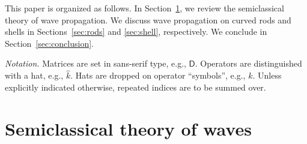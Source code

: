This paper is organized as follows.
In Section~\ref{sec:wkb}, we review the semiclassical theory of wave propagation.
We discuss wave propagation on curved rods and shells in Sections~\ref{sec:rods} and \ref{sec:shell}, respectively.
We conclude in Section~\ref{sec:conclusion}.\\[-0.5em]

\begin{small}
\noindent\emph{Notation.\enspace} Matrices are set in sans-serif type, e.g., $\mathsf{D}$. Operators are distinguished with a hat, e.g., $\hat{k}$.  Hats are dropped on operator ``symbols'', e.g., $k$.  Unless explicitly indicated otherwise, repeated indices are to be summed over.\par
\end{small}

\section{Semiclassical theory of waves}
\label{sec:wkb}

